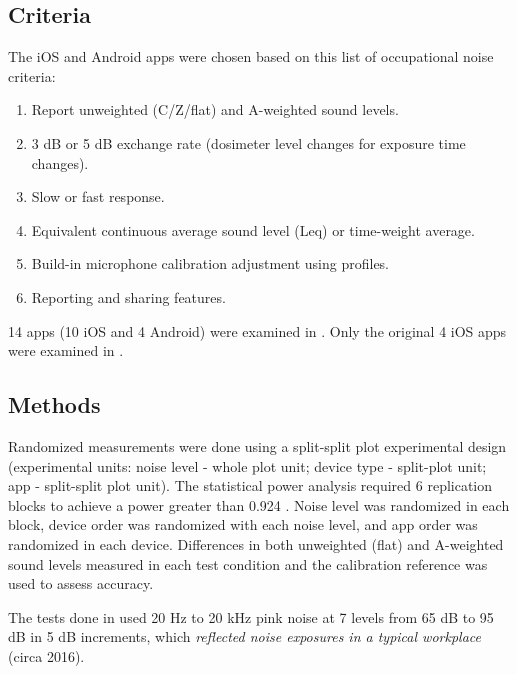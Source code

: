 \subsection*{Criteria}

\vspace{-0.3cm}
The iOS and Android apps were chosen based on this list of occupational noise criteria:

\begin{enumerate}[itemsep=-0.2cm]
  \item Report unweighted (C/Z/flat) and A-weighted sound levels.
  \item 3 dB or 5 dB exchange rate (dosimeter level changes for exposure time changes).
  \item Slow or fast response.
  \item Equivalent continuous average sound level (Leq) or time-weight average.
  \item Build-in microphone calibration adjustment using profiles.
  \item Reporting and sharing features.
\end{enumerate}

14 apps (10 iOS and 4 Android) were examined in \cite{kardous_and_shaw_2014}.  Only the original 4 iOS apps were examined in \cite{kardous_and_shaw_2016}.






\vspace{-0.5cm}
\subsection*{Methods}

\vspace{-0.3cm}
Randomized measurements were done using a split-split plot experimental design (experimental units:  noise level - whole plot unit;  device type - split-plot unit;  app - split-split plot unit).  The statistical power analysis required 6 replication blocks to achieve a power greater than 0.924 \citep{kardous_and_shaw_2014}.  Noise level was randomized in each block, device order was randomized with each noise level, and app order was randomized in each device.  Differences in both unweighted (flat) and A-weighted sound levels measured in each test condition and the calibration reference was used to assess accuracy.

The tests done in \cite{kardous_and_shaw_2014, kardous_and_shaw_2016} used 20 Hz to 20 kHz pink noise at 7 levels from 65 dB to 95 dB in 5 dB increments, which \textit{reflected noise exposures in a typical workplace} (circa 2016).

